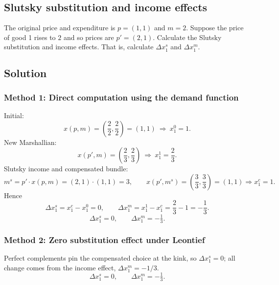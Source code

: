 \documentclass[12pt]{article}
\newcommand{\dotp}{\cdot}
\begin{document}
\newpage
\subsection{Slutsky substitution and income effects}
The original price and expenditure is \(p=(1,1)\) and \(m=2\).
Suppose the price of good 1 rises to \(2\) and so prices are \(p'=(2,1)\).
Calculate the Slutsky substitution and income effects. That is, calculate \(\Delta x_1^{s}\) and \(\Delta x_1^{m}\).

\subsection*{Solution}
\subsubsection*{Method 1: Direct computation using the demand function}
Initial:
\[
x(p,m)=\left(\frac{2}{2},\frac{2}{2}\right)=(1,1)\ \Rightarrow\ x_1^0=1.
\]
New Marshallian:
\[
x(p',m)=\left(\frac{2}{3},\frac{2}{3}\right)\ \Rightarrow\ x_1^1=\frac{2}{3}.
\]
Slutsky income and compensated bundle:
\[
m^s=p'\dotp x(p,m)=(2,1)\dotp(1,1)=3,\qquad
x(p',m^s)=\left(\frac{3}{3},\frac{3}{3}\right)=(1,1)\Rightarrow x_1^c=1.
\]
Hence
\[
\Delta x_1^{s}=x_1^c-x_1^0=0,\qquad
\Delta x_1^{m}=x_1^1-x_1^c=\frac{2}{3}-1=-\frac{1}{3}.
\]
\[
\boxed{\Delta x_1^{s}=0,\qquad \Delta x_1^{m}=-\tfrac13.}
\]

\subsubsection*{Method 2: Zero substitution effect under Leontief}
Perfect complements pin the compensated choice at the kink, so \(\Delta x_1^{s}=0\); all change comes from the income effect, \(\Delta x_1^{m}=-1/3\).
\[
\boxed{\Delta x_1^{s}=0,\qquad \Delta x_1^{m}=-\tfrac13.}
\]
\end{document}
